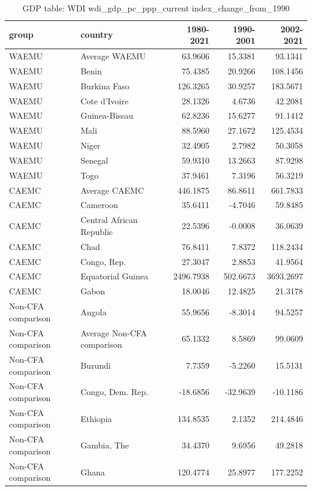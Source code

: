 \begin{table}

\caption{GDP table: WDI wdi_gdp_pc_ppp_current index_change_from_1990}
\centering
\begin{tabular}[t]{llrrr}
\toprule
group & country & 1980-2021 & 1990-2001 & 2002-2021\\
\midrule
WAEMU & Average WAEMU & 63.9606 & 15.3381 & 93.1341\\
WAEMU & Benin & 75.4385 & 20.9266 & 108.1456\\
WAEMU & Burkina Faso & 126.3265 & 30.9257 & 183.5671\\
WAEMU & Cote d'Ivoire & 28.1326 & 4.6736 & 42.2081\\
WAEMU & Guinea-Bissau & 62.8236 & 15.6277 & 91.1412\\
\addlinespace
WAEMU & Mali & 88.5960 & 27.1672 & 125.4534\\
WAEMU & Niger & 32.4905 & 2.7982 & 50.3058\\
WAEMU & Senegal & 59.9310 & 13.2663 & 87.9298\\
WAEMU & Togo & 37.9461 & 7.3196 & 56.3219\\
CAEMC & Average CAEMC & 446.1875 & 86.8611 & 661.7833\\
\addlinespace
CAEMC & Cameroon & 35.6411 & -4.7046 & 59.8485\\
CAEMC & Central African Republic & 22.5396 & -0.0008 & 36.0639\\
CAEMC & Chad & 76.8411 & 7.8372 & 118.2434\\
CAEMC & Congo, Rep. & 27.3047 & 2.8853 & 41.9564\\
CAEMC & Equatorial Guinea & 2496.7938 & 502.6673 & 3693.2697\\
\addlinespace
CAEMC & Gabon & 18.0046 & 12.4825 & 21.3178\\
Non-CFA comparison & Angola & 55.9656 & -8.3014 & 94.5257\\
Non-CFA comparison & Average Non-CFA comparison & 65.1332 & 8.5869 & 99.0609\\
Non-CFA comparison & Burundi & 7.7359 & -5.2260 & 15.5131\\
Non-CFA comparison & Congo, Dem. Rep. & -18.6856 & -32.9639 & -10.1186\\
\addlinespace
Non-CFA comparison & Ethiopia & 134.8535 & 2.1352 & 214.4846\\
Non-CFA comparison & Gambia, The & 34.4370 & 9.6956 & 49.2818\\
Non-CFA comparison & Ghana & 120.4774 & 25.8977 & 177.2252\\

\end{tabular}
\end{table}
